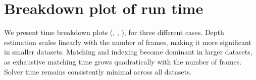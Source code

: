 

\section{Breakdown plot of run time}
\label{app:breakdown-time}

We present time breakdown plots (, , ), for three different cases. Depth estimation scales linearly with the number of frames, making it more significant in smaller datasets. Matching and indexing become dominant in larger datasets, as exhaustive matching time grows quadratically with the number of frames. Solver time remains consistently minimal across all datasets.  
